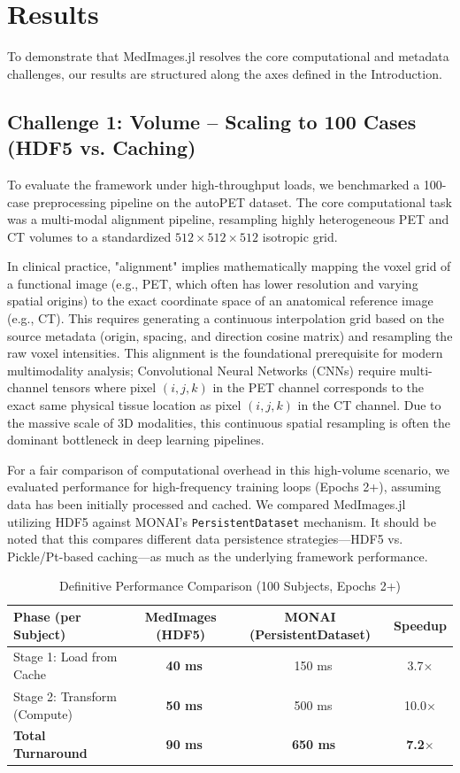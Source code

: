 \documentclass[10pt,letterpaper]{article}
\begin{document}
\section{Results}
To demonstrate that MedImages.jl resolves the core computational and metadata challenges, our results are structured along the axes defined in the Introduction.

\subsection*{Challenge 1: Volume -- Scaling to 100 Cases (HDF5 vs. Caching)}
To evaluate the framework under high-throughput loads, we benchmarked a 100-case preprocessing pipeline on the autoPET dataset. The core computational task was a multi-modal alignment pipeline, resampling highly heterogeneous PET and CT volumes to a standardized $512 \times 512 \times 512$ isotropic grid. 

In clinical practice, "alignment" implies mathematically mapping the voxel grid of a functional image (e.g., PET, which often has lower resolution and varying spatial origins) to the exact coordinate space of an anatomical reference image (e.g., CT). This requires generating a continuous interpolation grid based on the source metadata (origin, spacing, and direction cosine matrix) and resampling the raw voxel intensities. This alignment is the foundational prerequisite for modern multimodality analysis; Convolutional Neural Networks (CNNs) require multi-channel tensors where pixel $(i,j,k)$ in the PET channel corresponds to the exact same physical tissue location as pixel $(i,j,k)$ in the CT channel. Due to the massive scale of 3D modalities, this continuous spatial resampling is often the dominant bottleneck in deep learning pipelines.

For a fair comparison of computational overhead in this high-volume scenario, we evaluated performance for high-frequency training loops (Epochs 2+), assuming data has been initially processed and cached. We compared MedImages.jl utilizing HDF5 against MONAI's \texttt{PersistentDataset} mechanism. It should be noted that this compares different data persistence strategies—HDF5 vs. Pickle/Pt-based caching—as much as the underlying framework performance.

\begin{table}[H]
\centering
\caption{Definitive Performance Comparison (100 Subjects, Epochs 2+)}
\begin{tabular}{|l|c|c|c|}
\hline
\textbf{Phase (per Subject)} & \textbf{MedImages (HDF5)} & \textbf{MONAI (PersistentDataset)} & \textbf{Speedup} \\
\hline
Stage 1: Load from Cache & \textbf{~40 ms} & ~150 ms & 3.7$\times$ \\
Stage 2: Transform (Compute) & \textbf{~50 ms} & ~500 ms & 10.0$\times$ \\
\hline
\textbf{Total Turnaround} & \textbf{~90 ms} & \textbf{~650 ms} & \textbf{7.2$\times$} \\
\hline
\end{tabular}
\label{tab:scaling_comparison}
\end{table}
\end{document}
